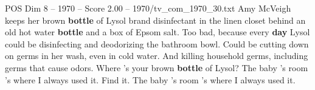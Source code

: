 \begin{textsample}{POS Dim 8 – 1970 – Score 2.00 – 1970/tv\_com\_1970\_30.txt}  \label{ex:f8_pos_082}
Amy McVeigh keeps her brown \textbf{bottle} of Lysol brand disinfectant in the linen closet behind an old hot water \textbf{bottle} and a box of Epsom salt.
Too bad, because every \textbf{day} Lysol could be disinfecting and deodorizing the bathroom bowl.
Could be cutting down on germs in her wash, even in cold water.
And killing household germs, including germs that cause odors.
Where 's your brown \textbf{bottle} of Lysol?
The baby 's room 's where I always used it.
Find it.
The baby 's room 's where I always used it.

\end{textsample}
